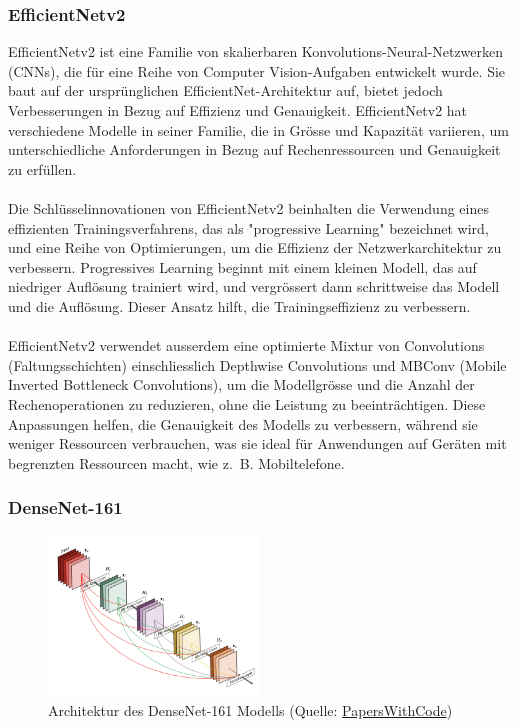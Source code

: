 \documentclass{article}
\begin{document}
\newpage

\subsubsection{EfficientNetv2}

EfficientNetv2 \cite{tan_efficientnetv2_2021} ist eine Familie von skalierbaren Konvolutions-Neural-Netzwerken (CNNs), die für eine Reihe von Computer Vision-Aufgaben entwickelt wurde. Sie baut auf der ursprünglichen EfficientNet-Architektur auf, bietet jedoch Verbesserungen in Bezug auf Effizienz und Genauigkeit. EfficientNetv2 hat verschiedene Modelle in seiner Familie, die in Grösse und Kapazität variieren, um unterschiedliche Anforderungen in Bezug auf Rechenressourcen und Genauigkeit zu erfüllen.\\\\
Die Schlüsselinnovationen von EfficientNetv2 beinhalten die Verwendung eines effizienten Trainingsverfahrens, das als "progressive Learning" bezeichnet wird, und eine Reihe von Optimierungen, um die Effizienz der Netzwerkarchitektur zu verbessern. Progressives Learning beginnt mit einem kleinen Modell, das auf niedriger Auflösung trainiert wird, und vergrössert dann schrittweise das Modell und die Auflösung. Dieser Ansatz hilft, die Trainingseffizienz zu verbessern.\\\\
EfficientNetv2 verwendet ausserdem eine optimierte Mixtur von Convolutions (Faltungsschichten) einschliesslich Depthwise Convolutions und MBConv (Mobile Inverted Bottleneck Convolutions), um die Modellgrösse und die Anzahl der Rechenoperationen zu reduzieren, ohne die Leistung zu beeinträchtigen. Diese Anpassungen helfen, die Genauigkeit des Modells zu verbessern, während sie weniger Ressourcen verbrauchen, was sie ideal für Anwendungen auf Geräten mit begrenzten Ressourcen macht, wie z. B. Mobiltelefone. 


\subsubsection{DenseNet-161}

\begin{figure}[!h]
    \centering
    \includegraphics[width=0.5\textwidth]{images/model_architecture/densenet.png}
    \caption{\label{fig:resnet_50_architecture}Architektur des DenseNet-161 Modells (Quelle: \href{https://paperswithcode.com/lib/torchvision/densenet}{PapersWithCode})}
\end{figure}
\end{document}
